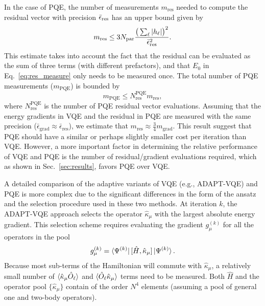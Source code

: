 \documentclass[aps,prx, reprint]{revtex4-2}
\begin{document}
In the case of PQE, the number of measurements $m_\text{res}$ needed to compute the residual vector with precision $\bar{\epsilon}_{\rm{res}}$ has an upper bound given by
\begin{equation}
m_\text{res} \leq 3 N_{\rm{par}} \frac{ \big( \sum_\ell | h_\ell | \big)^2 }{ \bar{\epsilon}_{\rm{res}}^2 }.
\end{equation}
This estimate takes into account the fact that the residual can be evaluated as the sum of three terms (with different prefactors), and that $E_0$ in Eq.~\eqref{eq:res_measure} only needs to be measured once.
The total number of PQE measurements ($m_\text{PQE}$) is bounded by
\begin{equation}
m_\text{PQE} \leq N_\text{res}^\text{PQE} m_\text{res},
\end{equation}
where $N_\text{res}^\text{PQE}$ is the number of PQE residual vector evaluations.
Assuming that the energy gradients in VQE and the residual in PQE are measured with the same precision ($\bar{\epsilon}_\text{grad} \approx \bar{\epsilon}_{\text{res}}$), we estimate that  $m_\text{res}  \approx \frac{3}{4} m_\text{grad}$.
This result suggest that PQE should have a similar or perhaps slightly smaller cost per iteration than VQE.
However, a more important factor in determining the relative performance of VQE and PQE is the number of residual/gradient evaluations required, which as  shown in Sec.~\ref{sec:results}, favors PQE over VQE.

A detailed comparison of the adaptive variants of VQE (e.g., ADAPT-VQE) and PQE is more complex due to the significant differences in the form of the ansatz and the selection procedure used in these two methods.
At iteration $k$, the ADAPT-VQE approach selects the operator $\hat{\kappa}_\mu$ with the largest absolute energy gradient.
This selection scheme requires evaluating the gradient $g_\mu^{(k)}$ for all the operators in the pool
\begin{equation}
g_\mu^{(k)} = \bra{\Psi^{(k)}} [ \hat{H}, \hat{\kappa}_\mu ] \ket{\Psi^{(k)}}.
\label{eq:adapt_imp_metric}
\end{equation}
Because most sub-terms of the Hamiltonian will commute with $\hat{\kappa}_\mu$, a relatively small number of $\braket{ \hat{\kappa}_\mu \hat{O}_\ell }$ and $\braket{ \hat{O}_\ell \hat{\kappa}_\mu }$ terms need to be measured.
Both $\hat{H}$ and the operator pool $\{ \hat{\kappa}_\mu \}$ contain of the order $N^4$ elements (assuming a pool of general one and two-body operators).
\end{document}

